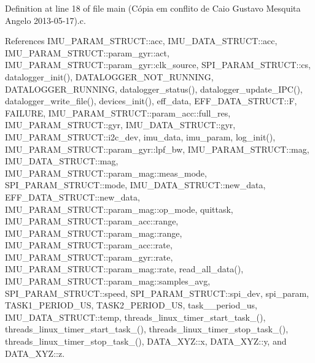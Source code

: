 Definition at line 18 of file main (\-Cópia em conflito de Caio Gustavo Mesquita Angelo 2013-\/05-\/17).\-c.



References I\-M\-U\-\_\-\-P\-A\-R\-A\-M\-\_\-\-S\-T\-R\-U\-C\-T\-::acc, I\-M\-U\-\_\-\-D\-A\-T\-A\-\_\-\-S\-T\-R\-U\-C\-T\-::acc, I\-M\-U\-\_\-\-P\-A\-R\-A\-M\-\_\-\-S\-T\-R\-U\-C\-T\-::param\-\_\-gyr\-::act, I\-M\-U\-\_\-\-P\-A\-R\-A\-M\-\_\-\-S\-T\-R\-U\-C\-T\-::param\-\_\-gyr\-::clk\-\_\-source, S\-P\-I\-\_\-\-P\-A\-R\-A\-M\-\_\-\-S\-T\-R\-U\-C\-T\-::cs, datalogger\-\_\-init(), D\-A\-T\-A\-L\-O\-G\-G\-E\-R\-\_\-\-N\-O\-T\-\_\-\-R\-U\-N\-N\-I\-N\-G, D\-A\-T\-A\-L\-O\-G\-G\-E\-R\-\_\-\-R\-U\-N\-N\-I\-N\-G, datalogger\-\_\-status(), datalogger\-\_\-update\-\_\-\-I\-P\-C(), datalogger\-\_\-write\-\_\-file(), devices\-\_\-init(), eff\-\_\-data, E\-F\-F\-\_\-\-D\-A\-T\-A\-\_\-\-S\-T\-R\-U\-C\-T\-::\-F, F\-A\-I\-L\-U\-R\-E, I\-M\-U\-\_\-\-P\-A\-R\-A\-M\-\_\-\-S\-T\-R\-U\-C\-T\-::param\-\_\-acc\-::full\-\_\-res, I\-M\-U\-\_\-\-P\-A\-R\-A\-M\-\_\-\-S\-T\-R\-U\-C\-T\-::gyr, I\-M\-U\-\_\-\-D\-A\-T\-A\-\_\-\-S\-T\-R\-U\-C\-T\-::gyr, I\-M\-U\-\_\-\-P\-A\-R\-A\-M\-\_\-\-S\-T\-R\-U\-C\-T\-::i2c\-\_\-dev, imu\-\_\-data, imu\-\_\-param, log\-\_\-init(), I\-M\-U\-\_\-\-P\-A\-R\-A\-M\-\_\-\-S\-T\-R\-U\-C\-T\-::param\-\_\-gyr\-::lpf\-\_\-bw, I\-M\-U\-\_\-\-P\-A\-R\-A\-M\-\_\-\-S\-T\-R\-U\-C\-T\-::mag, I\-M\-U\-\_\-\-D\-A\-T\-A\-\_\-\-S\-T\-R\-U\-C\-T\-::mag, I\-M\-U\-\_\-\-P\-A\-R\-A\-M\-\_\-\-S\-T\-R\-U\-C\-T\-::param\-\_\-mag\-::meas\-\_\-mode, S\-P\-I\-\_\-\-P\-A\-R\-A\-M\-\_\-\-S\-T\-R\-U\-C\-T\-::mode, I\-M\-U\-\_\-\-D\-A\-T\-A\-\_\-\-S\-T\-R\-U\-C\-T\-::new\-\_\-data, E\-F\-F\-\_\-\-D\-A\-T\-A\-\_\-\-S\-T\-R\-U\-C\-T\-::new\-\_\-data, I\-M\-U\-\_\-\-P\-A\-R\-A\-M\-\_\-\-S\-T\-R\-U\-C\-T\-::param\-\_\-mag\-::op\-\_\-mode, quittask, I\-M\-U\-\_\-\-P\-A\-R\-A\-M\-\_\-\-S\-T\-R\-U\-C\-T\-::param\-\_\-acc\-::range, I\-M\-U\-\_\-\-P\-A\-R\-A\-M\-\_\-\-S\-T\-R\-U\-C\-T\-::param\-\_\-mag\-::range, I\-M\-U\-\_\-\-P\-A\-R\-A\-M\-\_\-\-S\-T\-R\-U\-C\-T\-::param\-\_\-acc\-::rate, I\-M\-U\-\_\-\-P\-A\-R\-A\-M\-\_\-\-S\-T\-R\-U\-C\-T\-::param\-\_\-gyr\-::rate, I\-M\-U\-\_\-\-P\-A\-R\-A\-M\-\_\-\-S\-T\-R\-U\-C\-T\-::param\-\_\-mag\-::rate, read\-\_\-all\-\_\-data(), I\-M\-U\-\_\-\-P\-A\-R\-A\-M\-\_\-\-S\-T\-R\-U\-C\-T\-::param\-\_\-mag\-::samples\-\_\-avg, S\-P\-I\-\_\-\-P\-A\-R\-A\-M\-\_\-\-S\-T\-R\-U\-C\-T\-::speed, S\-P\-I\-\_\-\-P\-A\-R\-A\-M\-\_\-\-S\-T\-R\-U\-C\-T\-::spi\-\_\-dev, spi\-\_\-param, T\-A\-S\-K1\-\_\-\-P\-E\-R\-I\-O\-D\-\_\-\-U\-S, T\-A\-S\-K2\-\_\-\-P\-E\-R\-I\-O\-D\-\_\-\-U\-S, task\-\_\-\_\-period\-\_\-us, I\-M\-U\-\_\-\-D\-A\-T\-A\-\_\-\-S\-T\-R\-U\-C\-T\-::temp, threads\-\_\-linux\-\_\-timer\-\_\-start\-\_\-task\-\_(), threads\-\_\-linux\-\_\-timer\-\_\-start\-\_\-task\-\_(), threads\-\_\-linux\-\_\-timer\-\_\-stop\-\_\-task\-\_(), threads\-\_\-linux\-\_\-timer\-\_\-stop\-\_\-task\-\_(), D\-A\-T\-A\-\_\-\-X\-Y\-Z\-::x, D\-A\-T\-A\-\_\-\-X\-Y\-Z\-::y, and D\-A\-T\-A\-\_\-\-X\-Y\-Z\-::z.


